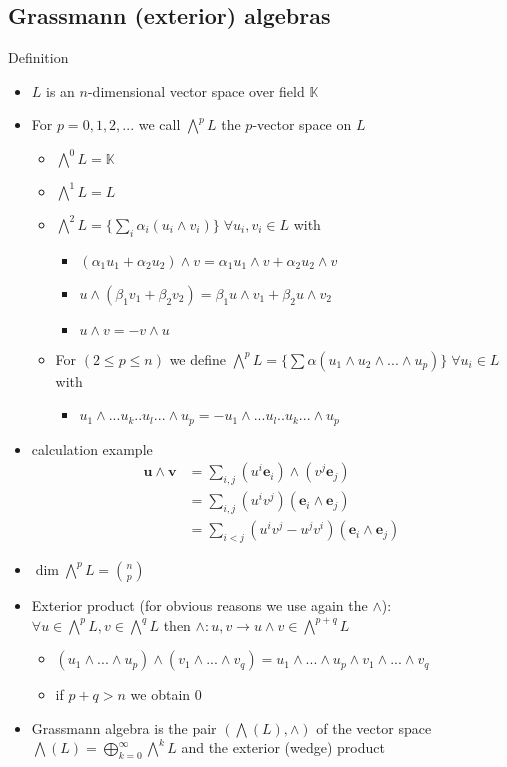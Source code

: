 \documentclass[../main.tex]{subfiles}
\begin{document}
\begin{itemize}
\subsection{Grassmann (exterior) algebras}
Definition
\begin{itemize}
\item $L$ is an $n$-dimensional vector space over field $\mathbb{K}$
\item For $p=0,1,2,...$ we call $\bigwedge^pL$ the $p$-vector space on $L$
\begin{itemize}
\item $\bigwedge^0L=\mathbb{K}$
\item $\bigwedge^1L=L$
\item $\bigwedge^2L=\{\sum_i\alpha_i(u_i\wedge v_i)\}\; \forall u_i, v_i \in L$ with
\begin{itemize}
\item $(\alpha_1u_1+\alpha_2u_2)\wedge v=\alpha_1u_1\wedge v+\alpha_2u_2\wedge v$
\item $u\wedge (\beta_1v_1+\beta_2v_2)=\beta_1u\wedge v_1+\beta_2u\wedge v_2$
\item $u\wedge v=-v\wedge u$
\end{itemize}
\item For $(2\le p \le n)$ we define $\bigwedge^pL=\{\sum\alpha(u_1\wedge u_2\wedge...\wedge u_p)\}\; \forall u_i \in L$ with
\begin{itemize}
\item $u_1\wedge...u_k.. u_l...\wedge u_p=-u_1\wedge...u_l.. u_k...\wedge u_p$
\end{itemize}
\end{itemize}
\item calculation example
\begin{align}
\mathbf{u}\wedge\mathbf{v}
&=\sum_{i,j}(u^i\mathbf{e}_i)\wedge(v^j\mathbf{e}_j)\\
&=\sum_{i,j}(u^iv^j)(\mathbf{e}_i\wedge\mathbf{e}_j)\\
&=\sum_{i<j}(u^iv^j-u^jv^i)(\mathbf{e}_i\wedge\mathbf{e}_j)
\end{align}
\item $\dim \bigwedge^pL=\binom{n}{p}$
\item Exterior product (for obvious reasons we use again the $\wedge$): $\forall u\in\bigwedge^pL, v\in\bigwedge^qL$ then  $\wedge: u,v\rightarrow u\wedge v\in\bigwedge^{p+q}L$
\begin{itemize}
\item $(u_1\wedge...\wedge u_p)\wedge(v_1\wedge...\wedge v_q)=u_1\wedge...\wedge u_p\wedge v_1\wedge...\wedge v_q$
\item if $p+q>n$ we obtain 0
\end{itemize}
\item Grassmann algebra is the pair $(\bigwedge(L),\wedge)$ of the vector space $\bigwedge(L) = \bigoplus_{k=0}^\infty \bigwedge^kL$ and the exterior (wedge) product
\end{itemize}


\end{itemize}
\end{document}
